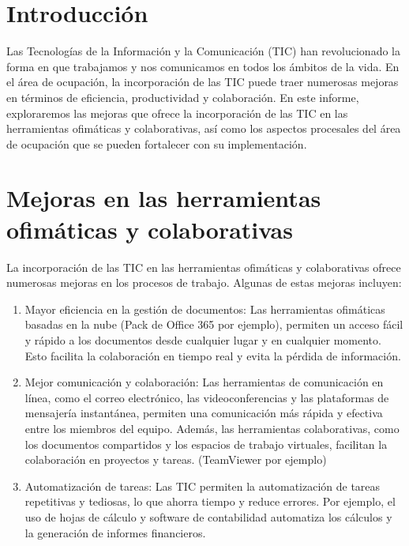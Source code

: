 \documentclass{article}
\theoremstyle{mytheoremstyle}
\theoremstyle{mytheoremstyle}
\theoremstyle{myproblemstyle}
\begin{document}
    \newpage


\section{Introducción}

Las Tecnologías de la Información y la Comunicación (TIC) han revolucionado la forma en que trabajamos y nos comunicamos en todos los ámbitos de la vida. En el área de ocupación, la incorporación de las TIC puede traer numerosas mejoras en términos de eficiencia, productividad y colaboración. En este informe, exploraremos las mejoras que ofrece la incorporación de las TIC en las herramientas ofimáticas y colaborativas, así como los aspectos procesales del área de ocupación que se pueden fortalecer con su implementación.

\newpage
\section{Mejoras en las herramientas ofimáticas y colaborativas}

La incorporación de las TIC en las herramientas ofimáticas y colaborativas ofrece numerosas mejoras en los procesos de trabajo. Algunas de estas mejoras incluyen:

\begin{enumerate}
  \item Mayor eficiencia en la gestión de documentos: Las herramientas ofimáticas basadas en la nube (Pack de Office 365 por ejemplo), permiten un acceso fácil y rápido a los documentos desde cualquier lugar y en cualquier momento. Esto facilita la colaboración en tiempo real y evita la pérdida de información.
  
  \item Mejor comunicación y colaboración: Las herramientas de comunicación en línea, como el correo electrónico, las videoconferencias y las plataformas de mensajería instantánea, permiten una comunicación más rápida y efectiva entre los miembros del equipo. Además, las herramientas colaborativas, como los documentos compartidos y los espacios de trabajo virtuales, facilitan la colaboración en proyectos y tareas. (TeamViewer por ejemplo)
  
  \item Automatización de tareas: Las TIC permiten la automatización de tareas repetitivas y tediosas, lo que ahorra tiempo y reduce errores. Por ejemplo, el uso de hojas de cálculo y software de contabilidad automatiza los cálculos y la generación de informes financieros.
\end{enumerate}
\end{document}
